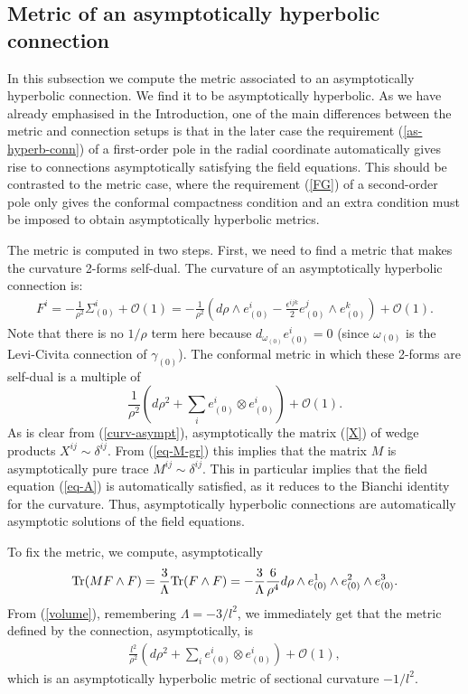 \documentclass[a4paper,12pt]{article}
\newcommand{\Si}{\Sigma}
\newcommand{\Oc}{\mathcal{O}}
\newcommand{\W}{\wedge}
\newcommand{\eps}{\epsilon}
\newcommand{\be}{\begin{eqnarray}}
\newcommand{\ee}{\end{eqnarray}}
\begin{document}
\subsection{Metric of an asymptotically hyperbolic connection}

In this subsection we compute the metric associated to an asymptotically hyperbolic connection. We find it to be asymptotically hyperbolic. As we have already emphasised in the Introduction, one of the main differences between the metric and connection setups is that in the later case the requirement (\ref{as-hyperb-conn}) of a first-order pole in the radial coordinate automatically gives rise to connections asymptotically satisfying the field equations. This should be contrasted to the metric case, where the requirement (\ref{FG}) of a second-order pole only gives the conformal compactness condition and an extra condition must be imposed to obtain asymptotically hyperbolic metrics.%

The metric is computed in two steps. First, we need to find a metric that makes the curvature 2-forms self-dual. The curvature of an asymptotically hyperbolic connection is:
\be\label{curv-asympt}
F^i = -\frac{1}{\rho^2}\Si^i_{(0)}+\Oc (1) = -\frac{1}{\rho^2}\left( d\rho\W e^i_{(0)}-\frac{\eps^{ijk}}{2}e^j_{(0)}\W e^k_{(0)} \right )+\Oc (1). 
\ee
Note that there is no $1/\rho$ term here because $d_{\omega_{(0)}} e_{(0)}^i = 0$ (since $\omega_{(0)}$ is the Levi-Civita connection of $\gamma_{(0)}$). 
The conformal metric in which these 2-forms are self-dual is a multiple of 
\[ 
\frac{1}{\rho^2}\left(d\rho^2+ \sum_{i} e^i_{(0)}\otimes e^i_{(0)}\right)+\Oc (1).
\]
As is clear from (\ref{curv-asympt}), asymptotically the matrix (\ref{X}) of wedge products $X^{ij}\sim\delta^{ij}$. From (\ref{eq-M-gr}) this implies that the matrix $M$ is asymptotically pure trace $M^{ij}\sim \delta^{ij}$. This in particular implies that the field equation (\ref{eq-A}) is automatically satisfied, as it reduces to the Bianchi identity for the curvature. Thus, asymptotically hyperbolic connections are automatically asymptotic solutions of the field equations. 

To fix the metric, we compute, asymptotically
\be
{\rm Tr}(M F\wedge F) = \frac{3}{\Lambda}{\rm Tr}(F\wedge F) = - \frac{3}{\Lambda} \frac{6}{\rho^4} d\rho\wedge e_{(0)}^1\wedge e_{(0)}^2\wedge e_{(0)}^3.
\ee
From (\ref{volume}), remembering $\Lambda=-3/l^2$, we immediately get that the metric defined by the connection, asymptotically, is
\be
\frac{l^2}{\rho^2}\left(d\rho^2+ \sum_{i} e^i_{(0)}\otimes e^i_{(0)}\right)+\Oc (1),
\ee
which is an asymptotically hyperbolic metric of sectional curvature $-1/l^2$. 
\end{document}
